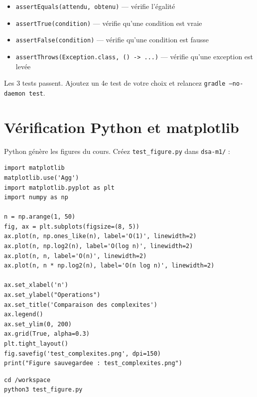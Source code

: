 \documentclass[11pt,a4paper]{article}
\begin{document}
\begin{infobox}
\begin{itemize}[nosep]
    \item \texttt{assertEquals(attendu, obtenu)} --- vérifie l'égalité
    \item \texttt{assertTrue(condition)} --- vérifie qu'une condition est vraie
    \item \texttt{assertFalse(condition)} --- vérifie qu'une condition est fausse
    \item \texttt{assertThrows(Exception.class, () -> ...)} --- vérifie qu'une exception est levée
\end{itemize}
\end{infobox}

\begin{exercicebox}[Vérification 5]
Les 3 tests passent. Ajoutez un 4e test de votre choix et relancez \texttt{gradle --no-daemon test}.
\end{exercicebox}

\section{Vérification Python et matplotlib}

Python génère les figures du cours. Créez \texttt{test\_figure.py} dans \texttt{dsa-m1/} :

\begin{lstlisting}[style=python]
import matplotlib
matplotlib.use('Agg')
import matplotlib.pyplot as plt
import numpy as np

n = np.arange(1, 50)
fig, ax = plt.subplots(figsize=(8, 5))
ax.plot(n, np.ones_like(n), label='O(1)', linewidth=2)
ax.plot(n, np.log2(n), label='O(log n)', linewidth=2)
ax.plot(n, n, label='O(n)', linewidth=2)
ax.plot(n, n * np.log2(n), label='O(n log n)', linewidth=2)

ax.set_xlabel('n')
ax.set_ylabel("Operations")
ax.set_title('Comparaison des complexites')
ax.legend()
ax.set_ylim(0, 200)
ax.grid(True, alpha=0.3)
plt.tight_layout()
fig.savefig('test_complexites.png', dpi=150)
print("Figure sauvegardee : test_complexites.png")
\end{lstlisting}

\begin{lstlisting}[style=bash]
cd /workspace
python3 test_figure.py
\end{lstlisting}
\end{document}
